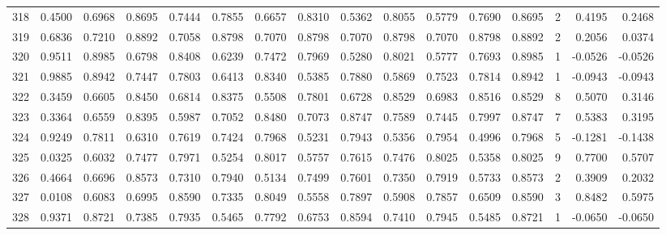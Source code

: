 \begin{tabular}{lrrrrrrrrrrrrrrr}
318 &      0.4500 &  0.6968 &  0.8695 &  0.7444 &  0.7855 &  0.6657 &  0.8310 &  0.5362 &  0.8055 &  0.5779 &   0.7690 &     0.8695 &      2 &                    0.4195 &                     0.2468 \\
319 &      0.6836 &  0.7210 &  0.8892 &  0.7058 &  0.8798 &  0.7070 &  0.8798 &  0.7070 &  0.8798 &  0.7070 &   0.8798 &     0.8892 &      2 &                    0.2056 &                     0.0374 \\
320 &      0.9511 &  0.8985 &  0.6798 &  0.8408 &  0.6239 &  0.7472 &  0.7969 &  0.5280 &  0.8021 &  0.5777 &   0.7693 &     0.8985 &      1 &                   -0.0526 &                    -0.0526 \\
321 &      0.9885 &  0.8942 &  0.7447 &  0.7803 &  0.6413 &  0.8340 &  0.5385 &  0.7880 &  0.5869 &  0.7523 &   0.7814 &     0.8942 &      1 &                   -0.0943 &                    -0.0943 \\
322 &      0.3459 &  0.6605 &  0.8450 &  0.6814 &  0.8375 &  0.5508 &  0.7801 &  0.6728 &  0.8529 &  0.6983 &   0.8516 &     0.8529 &      8 &                    0.5070 &                     0.3146 \\
323 &      0.3364 &  0.6559 &  0.8395 &  0.5987 &  0.7052 &  0.8480 &  0.7073 &  0.8747 &  0.7589 &  0.7445 &   0.7997 &     0.8747 &      7 &                    0.5383 &                     0.3195 \\
324 &      0.9249 &  0.7811 &  0.6310 &  0.7619 &  0.7424 &  0.7968 &  0.5231 &  0.7943 &  0.5356 &  0.7954 &   0.4996 &     0.7968 &      5 &                   -0.1281 &                    -0.1438 \\
325 &      0.0325 &  0.6032 &  0.7477 &  0.7971 &  0.5254 &  0.8017 &  0.5757 &  0.7615 &  0.7476 &  0.8025 &   0.5358 &     0.8025 &      9 &                    0.7700 &                     0.5707 \\
326 &      0.4664 &  0.6696 &  0.8573 &  0.7310 &  0.7940 &  0.5134 &  0.7499 &  0.7601 &  0.7350 &  0.7919 &   0.5733 &     0.8573 &      2 &                    0.3909 &                     0.2032 \\
327 &      0.0108 &  0.6083 &  0.6995 &  0.8590 &  0.7335 &  0.8049 &  0.5558 &  0.7897 &  0.5908 &  0.7857 &   0.6509 &     0.8590 &      3 &                    0.8482 &                     0.5975 \\
328 &      0.9371 &  0.8721 &  0.7385 &  0.7935 &  0.5465 &  0.7792 &  0.6753 &  0.8594 &  0.7410 &  0.7945 &   0.5485 &     0.8721 &      1 &                   -0.0650 &                    -0.0650 \\

\end{tabular}
